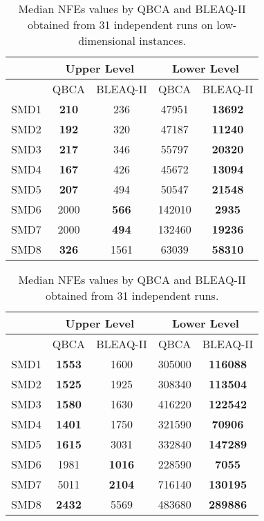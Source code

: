 \documentclass[conference]{IEEEtran}
\theoremstyle{definition}
\begin{document}
\begin{table}[t]
    \caption{Median NFEs values by QBCA and BLEAQ-II obtained from 31 independent runs on low-dimensional instances.}
    \label{tab:ul-comparative-fes-5}
    \centering
    \begin{tabular}{|c|c|c|c|c|}
\hline
& \multicolumn{2}{c|}{Upper Level} & \multicolumn{2}{c|}{Lower Level} \\ \hline
& QBCA & BLEAQ-II & QBCA & BLEAQ-II \\ \hline
SMD1 & \textbf{210} & 236 & 47951 & \textbf{13692}  \\ \hline 
SMD2 & \textbf{192} & 320 & 47187 & \textbf{11240}  \\ \hline 
SMD3 & \textbf{217} & 346 & 55797 & \textbf{20320}  \\ \hline 
SMD4 & \textbf{167} & 426 & 45672 & \textbf{13094}  \\ \hline 
SMD5 & \textbf{207} & 494 & 50547 & \textbf{21548}  \\ \hline 
SMD6 & 2000 & \textbf{566} & 142010 & \textbf{2935}  \\ \hline 
SMD7 & 2000 & \textbf{494} & 132460 & \textbf{19236}  \\ \hline 
SMD8 & \textbf{326} & 1561 & 63039 & \textbf{58310}  \\ \hline 
    \end{tabular}
\end{table}


\begin{table}[t]
    \caption{Median NFEs values by QBCA and BLEAQ-II obtained from 31 independent runs.}
    \label{tab:ul-comparative-fes}
    \centering
    \begin{tabular}{|c|c|c|c|c|}
\hline
& \multicolumn{2}{c|}{Upper Level} & \multicolumn{2}{c|}{Lower Level} \\ \hline
& QBCA & BLEAQ-II & QBCA & BLEAQ-II \\ \hline
SMD1 & \textbf{1553}  & 1600          &  305000 & \textbf{116088} \\ \hline
SMD2 & \textbf{1525}  & 1925          &  308340 & \textbf{113504} \\ \hline
SMD3 & \textbf{1580}  & 1630          &  416220 & \textbf{122542} \\ \hline
SMD4 & \textbf{1401} & 1750  &  321590 & \textbf{70906} \\ \hline
SMD5 & \textbf{1615}  & 3031          &  332840 & \textbf{147289} \\ \hline
SMD6 & 1981 &  \textbf{1016} &   228590& \textbf{7055} \\ \hline
SMD7 & 5011 &  \textbf{2104} & 716140  & \textbf{130195} \\ \hline
SMD8 & \textbf{2432}  & 5569          &  483680 & \textbf{289886} \\ \hline
    \end{tabular}
\end{table}
\end{document}
